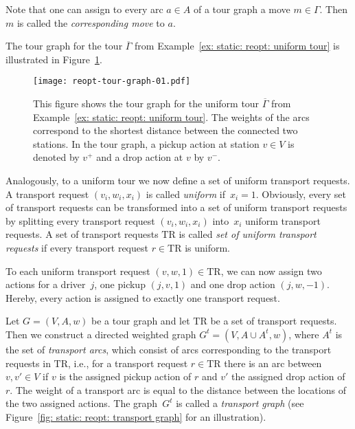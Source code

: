\documentclass[english]{llncs}
\numberwithin{sublemma}{lemma}
\newcommand{\tourd}{\ensuremath{\Gamma}}
\newcommand{\move}{\ensuremath{m}}
\newcommand{\TR}{\mathrm{TR}}
\begin{document}
Note that one can assign to every arc $a \in A$ of a tour graph a move $\move \in \tourd$.
Then $\move$ is called the \emph{corresponding move} to $a$.


\begin{example}
The tour graph for the tour $\overline{\tourd}$ from Example~\ref{ex: static: reopt: uniform tour} is illustrated in Figure~\ref{fig: static: reopt: tour 1 action}.
\begin{figure}[ht]
    \centering
    \texttt{[image: reopt-tour-graph-01.pdf]}
 \caption{
  This figure shows the tour graph for the uniform tour $\overline{\tourd}$ from Example~\ref{ex: static: reopt: uniform tour}.
  The weights of the arcs correspond to the shortest distance between the connected two stations.
  In the tour graph, a pickup action at station $v \in V$ is denoted by $v^+$ and a drop action at $v$ by $v^-$.
 }
 \label{fig: static: reopt: tour 1 action}
\end{figure}
\end{example}




Analogously, to a uniform tour we now define a set of uniform transport requests.
A transport request $(v_i, w_i, x_i)$ is called \emph{uniform} if~$x_i = 1$.
Obviously, every set of transport requests can be transformed into a set of uniform transport requests by splitting every transport request $(v_i, w_i, x_i)$ into~$x_i$ uniform transport requests.
A set of transport requests $\TR$ is called \emph{set of uniform transport requests} if every transport request $r \in \TR$ is uniform.


To each uniform transport request $(v, w, 1) \in \TR$, we can now assign two actions for a driver~$j$, one pickup $(j, v, 1)$ and one drop action $(j, w, -1)$.
Hereby, every action is assigned to exactly one transport request.

Let $G = (V, A, w)$ be a tour graph and let $\TR$ be a set of transport requests.
Then we construct a directed weighted graph $G^t = (V, A \cup A^t, w)$, where
$A^t$ is the set of \emph{transport arcs}, which consist of arcs corresponding to the transport requests in $\TR$,
i.e., for a transport request $r \in \TR$ there is an arc between $v, v' \in V$ if $v$ is the assigned pickup action of $r$ and $v'$ the assigned drop action of $r$.
The weight of a transport arc is equal to the distance between the locations of the two assigned actions.
The graph~$G^t$ is called a \emph{transport graph} (see Figure~\ref{fig: static: reopt: transport graph} for an illustration).
\end{document}
